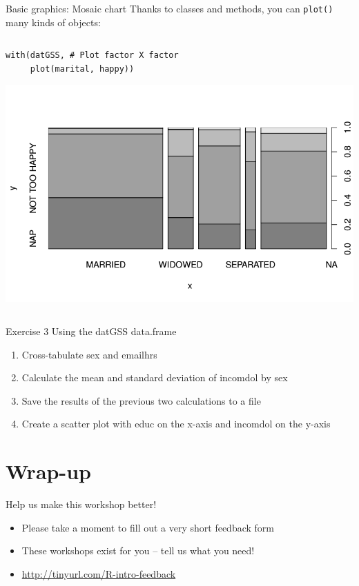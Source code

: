 \documentclass[table,smaller]{beamer}
\begin{document}
\begin{frame}[fragile,label=sec-7-9]{Basic graphics: Mosaic chart}
 Thanks to classes and methods, you can \verb~plot()~ many kinds of objects:
\begin{columns}  \begin{block}{}
\begin{verbatim}
with(datGSS, # Plot factor X factor
     plot(marital, happy))
\end{verbatim}
\includegraphics[width=.95\textwidth]{images/examplePlot3.png}

\end{block} \end{columns}
\end{frame}

\begin{frame}[label=sec-7-10]{Exercise 3}
Using the datGSS data.frame

\begin{enumerate}
\item Cross-tabulate sex and emailhrs
\item Calculate the mean and standard deviation of incomdol by sex
\item Save the results of the previous two calculations to a file
\item Create a scatter plot with educ on the x-axis and incomdol on the y-axis
\end{enumerate}
\end{frame}

\section{Wrap-up}
\label{sec-8}

\begin{frame}[label=sec-8-1]{Help us make this workshop better!}
\begin{itemize}
\item Please take a moment to fill out a very short feedback form

\item These workshops exist for you – tell us what you need!

\item \url{http://tinyurl.com/R-intro-feedback}
\end{itemize}
\end{frame}
\end{document}
